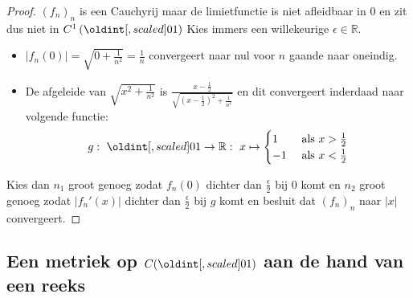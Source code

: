 \documentclass[main.tex]{subfiles}
\begin{document}
\begin{vb}
\begin{proof}
    $(f_{n})_{n}$ is een Cauchyrij maar de limietfunctie is niet afleidbaar in $0$ en zit dus niet in $C^{1}\left(\interval{0}{1}\right)$
    Kies immers een willekeurige $\epsilon\in\mathbb{R}$.
    \begin{itemize}
    \item $|f_{n}(0)| = \sqrt{0+\frac{1}{n^{2}}} = \frac{1}{n}$ convergeert naar nul voor $n$ gaande naar oneindig.
    \item De afgeleide van $\sqrt{x^{2}+ \frac{1}{n^{2}}}$ is $\frac{x-\frac{1}{2}}{\sqrt{\left(x-\frac{1}{2}\right)^{2}+ \frac{1}{n^{2}}}}$ en dit  convergeert inderdaad naar volgende functie:
      \begin{align}
        g:\ \interval{0}{1} \rightarrow \mathbb{R}:\
        x \mapsto 
        \begin{cases}
          1 &\text{ als } x > \frac{1}{2}\\
          -1 &\text{ als } x < \frac{1}{2}
        \end{cases}
      \end{align}
    \end{itemize}
    Kies dan $n_{1}$ groot genoeg zodat $f_{n}(0)$ dichter dan $\frac{\epsilon}{2}$ bij $0$ komt en $n_{2}$ groot genoeg zodat $|f_{n}'(x)|$ dichter dan $\frac{\epsilon}{2}$ bij $g$ komt en besluit dat $(f_{n})_{n}$ naar $|x|$ convergeert.
  \end{proof}
\fi
\end{vb}


\subsection{Een metriek op $C(\interval{0}{1})$ aan de hand van een reeks}
\end{document}
